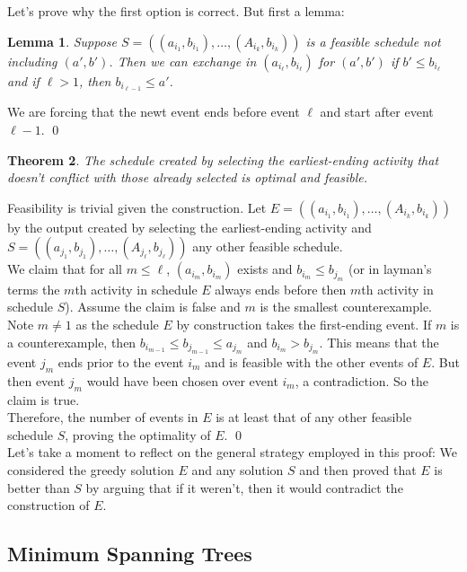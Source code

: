 \documentclass[10pt]{article}
\theoremstyle{plain}
\newtheorem{thm}{Theorem}[section] %
\newtheorem{lem}[thm]{Lemma}
\theoremstyle{definition}
\numberwithin{equation}{section}
\numberwithin{figure}{section}
\begin{document}
\noindent Let's prove why the first option is correct. But first a lemma:

\begin{lem}
Suppose $S = ((a_{i_1}, b_{i_1}), \ldots, (A_{i_k}, b_{i_k}))$ is a feasible schedule not including $(a',b')$. Then we can exchange in $(a_{i_\ell},b_{i_\ell})$ for $(a', b')$ if $b' \leq b_{i_\ell}$ and if $\ell > 1$, then $b_{i_{\ell - 1}} \leq a'$.
\end{lem}
\proof We are forcing that the newt event ends before event $\ell$ and start after event $\ell - 1$. \qed

\begin{thm}
The schedule created by selecting the earliest-ending activity that doesn't conflict with those already selected is optimal and feasible.
\end{thm}

\proof Feasibility is trivial given the construction. Let $E = ((a_{i_1}, b_{i_1}), \ldots, (A_{i_k}, b_{i_k}))$ by the output created by selecting the earliest-ending activity and $S = ((a_{j_1}, b_{j_1}), \ldots, (A_{j_\ell}, b_{j_\ell}))$ any other feasible schedule. \\

\noindent We claim that for all $m \leq \ell$, $(a_{i_m}, b_{i_m})$ exists and $b_{i_m} \leq b_{j_m}$ (or in layman's terms the $m$th activity in schedule $E$ always ends before then $m$th activity in schedule $S$). Assume the claim is false and $m$ is the smallest counterexample. Note $m \neq 1$ as the schedule $E$ by construction takes the first-ending event. If $m$ is a counterexample, then $b_{i_{m-1}} \leq b_{j_{m-1}} \leq a_{j_m}$ and $b_{i_m} > b_{j_m}$. This means that the event $j_m$ ends prior to the event $i_m$ and is feasible with the other events of $E$. But then event $j_m$ would have been chosen over event $i_m$, a contradiction. So the claim is true. \\

\noindent Therefore, the number of events in $E$ is at least that of any other feasible schedule $S$, proving the optimality of $E$. \qed \\

\noindent Let's take a moment to reflect on the general strategy employed in this proof: We considered the  greedy solution $E$ and any solution $S$ and then proved that $E$ is better than $S$ by arguing that if it weren't, then it would contradict the construction of $E$.

\subsection{Minimum Spanning Trees}
\end{document}

